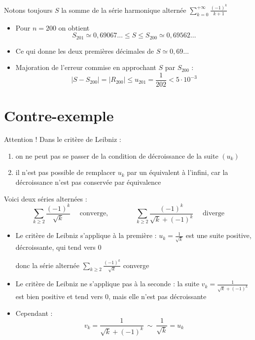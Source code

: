 \begin{frame}
\begin{exemple}
Notons toujours $S$ la somme de la série harmonique alternée 
$\displaystyle\sum_{k=0}^{+\infty} \frac{(-1)^{k}}{k+1}$
\begin{itemize}
  \item\pause Pour $n=200$ on obtient 
$$S_{201} \simeq 0,69067\ldots \le S \le S_{200} \simeq 0,69562\ldots$$
\item\pause Ce qui donne les deux premières décimales de $S \simeq 0,69\ldots$
\item\pause Majoration de l'erreur commise en approchant $S$ par $S_{200}$ :
\pause
$$|S-S_{200}| = |R_{200}| \le u_{201} = \frac{1}{202} < 5 \cdot 10^{-3}$$
\end{itemize}
\end{exemple}
\end{frame}

\section{Contre-exemple}

\begin{frame}

Attention ! Dans le critère de Leibniz :
\begin{enumerate}
  \item\pause on ne peut pas se passer de la condition 
  de décroissance de la suite $(u_k)$ 
  
  \item\pause il n'est pas possible de remplacer
$u_k$ par un équivalent à l'infini, car la décroissance n'est pas conservée par
équivalence
\end{enumerate}

\end{frame}

\begin{frame}
\begin{exemple}
Voici deux séries alternées :
$$
\sum_{k \ge 2}  \frac{(-1)^k}{\sqrt{k}}
\quad \text{ converge,}
\qquad\qquad
\sum_{k \ge 2}  \frac{(-1)^k}{\sqrt{k}+(-1)^k}
\quad \text{ diverge}
$$ 
\begin{itemize}
  \item\pause  Le critère de Leibniz s'applique à la première : 
  \pause $u_k = \frac{1}{\sqrt k}$ est une suite 
  \pause positive, \pause décroissante, \pause qui tend vers $0$

\pause 
donc la série alternée  $\sum_{k \ge 2}  \frac{(-1)^k}{\sqrt{k}}$ converge


\item\pause  Le critère de Leibniz ne s'applique pas à la seconde : \pause la suite $v_k = \frac{1}{\sqrt{k}+(-1)^k}$ est bien positive et tend vers $0$, \pause mais elle n'est pas
décroissante

\item\pause Cependant :
$$
v_k = \frac{1}{\sqrt{k}+(-1)^k} \ \sim \ \frac{1}{\sqrt{k}} = u_k
$$
\end{itemize}
\end{exemple}
\end{frame}

